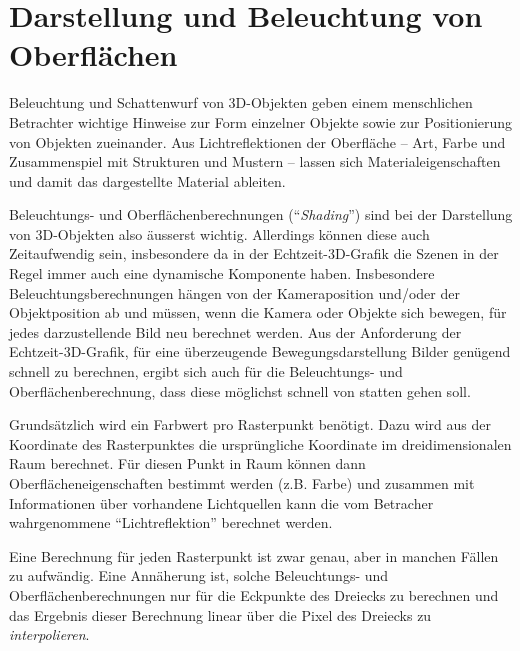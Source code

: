 \documentclass[twoside,a4paper,fleqn,12pt]{book}
\begin{document}
\section{Darstellung und Beleuchtung von Oberflächen}
\label{surface_and_shading}

Beleuchtung und Schattenwurf von 3D-Objekten geben einem menschlichen Betrachter wichtige Hinweise zur Form
einzelner Objekte sowie zur Positionierung von Objekten zueinander. Aus Lichtreflektionen der Oberfläche -- Art, Farbe und Zusammenspiel
mit Strukturen und Mustern -- lassen sich Materialeigenschaften und damit das dargestellte Material ableiten.

Beleuchtungs- und Oberflächenberechnungen (``\emph{Shading}'') sind bei der Darstellung von 3D-Objekten also äusserst wichtig.
Allerdings können diese auch Zeitaufwendig sein, insbesondere da in der Echtzeit-3D-Grafik die Szenen in der Regel
immer auch eine dynamische Komponente haben. Insbesondere Beleuchtungsberechnungen hängen von der Kameraposition
und/oder der Objektposition ab und müssen, wenn die Kamera oder Objekte sich bewegen, für jedes darzustellende Bild
neu berechnet werden. Aus der Anforderung der Echtzeit-3D-Grafik, für eine überzeugende Bewegungsdarstellung
Bilder genügend schnell zu berechnen, ergibt sich auch für die Beleuchtungs- und Oberflächenberechnung, dass diese
möglichst schnell von statten gehen soll.

Grundsätzlich wird ein Farbwert pro Rasterpunkt benötigt. Dazu wird aus der Koordinate des Rasterpunktes die ursprüngliche Koordinate
im dreidimensionalen Raum berechnet. Für diesen Punkt in Raum können dann Oberflächeneigenschaften bestimmt werden
(z.B. Farbe) und zusammen mit Informationen über vorhandene Lichtquellen kann die vom Betracher wahrgenommene 
"`Lichtreflektion"' berechnet werden.

Eine Berechnung für jeden Rasterpunkt ist zwar genau, aber in manchen Fällen zu aufwändig. Eine Annäherung ist,
solche Beleuchtungs- und Oberflächenberechnungen nur für die Eckpunkte des Dreiecks zu berechnen und das Ergebnis
dieser Berechnung linear über die Pixel des Dreiecks zu \emph{interpolieren}.
\end{document}
